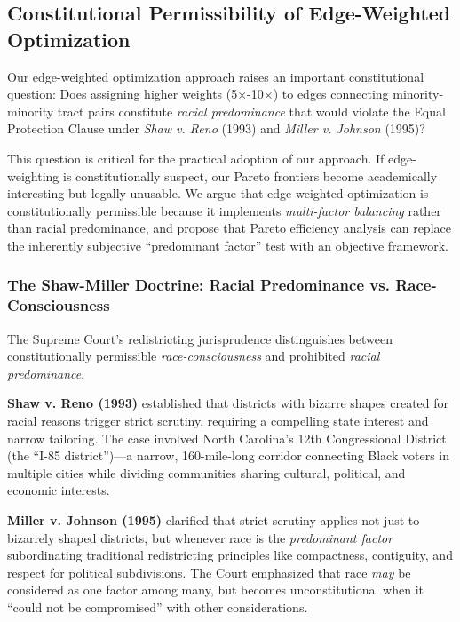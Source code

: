 \subsection{Constitutional Permissibility of Edge-Weighted Optimization}

Our edge-weighted optimization approach raises an important constitutional question: Does assigning higher weights (5×-10×) to edges connecting minority-minority tract pairs constitute \emph{racial predominance} that would violate the Equal Protection Clause under \emph{Shaw v. Reno} (1993) and \emph{Miller v. Johnson} (1995)?

This question is critical for the practical adoption of our approach. If edge-weighting is constitutionally suspect, our Pareto frontiers become academically interesting but legally unusable. We argue that edge-weighted optimization is constitutionally permissible because it implements \emph{multi-factor balancing} rather than racial predominance, and propose that Pareto efficiency analysis can replace the inherently subjective ``predominant factor'' test with an objective framework.

\subsubsection{The Shaw-Miller Doctrine: Racial Predominance vs. Race-Consciousness}

The Supreme Court's redistricting jurisprudence distinguishes between constitutionally permissible \emph{race-consciousness} and prohibited \emph{racial predominance}.

\textbf{Shaw v. Reno (1993)} established that districts with bizarre shapes created for racial reasons trigger strict scrutiny, requiring a compelling state interest and narrow tailoring. The case involved North Carolina's 12th Congressional District (the ``I-85 district'')---a narrow, 160-mile-long corridor connecting Black voters in multiple cities while dividing communities sharing cultural, political, and economic interests.

\textbf{Miller v. Johnson (1995)} clarified that strict scrutiny applies not just to bizarrely shaped districts, but whenever race is the \emph{predominant factor} subordinating traditional redistricting principles like compactness, contiguity, and respect for political subdivisions. The Court emphasized that race \emph{may} be considered as one factor among many, but becomes unconstitutional when it ``could not be compromised'' with other considerations.

